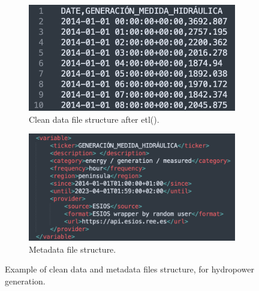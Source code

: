 \begin{figure}[H]
\centering
    \begin{subfigure}{.45\textwidth}
        \centering
        \includegraphics[width=1\linewidth]{images/methodology/clean_data_example}
        \caption{Clean data file structure after etl().}
        \label{fig:cleandata-example}
    \end{subfigure}
    \begin{subfigure}{.45\textwidth}
        \centering
        \includegraphics[width=1\linewidth]{images/methodology/metadata_example}
        \caption{Metadata file structure.}
        \label{fig:metadata-example}
    \end{subfigure}

    \caption{Example of clean data and metadata files structure, for hydropower generation.}
    \label{fig:cleandata-metadata-examples}
\end{figure}

